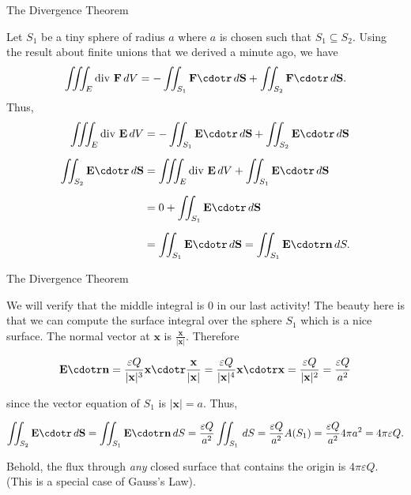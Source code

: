 \documentclass[11pt,english,
handout
]{beamer}
\begin{document}
\begin{frame}[t]{The Divergence Theorem}
\small
\begin{example}
Let $S_1$ be a tiny sphere of radius $a$ where $a$ is chosen such that $S_1\subseteq S_2$. \pause Using the result about finite unions that we derived a minute ago, we have
\[
\iiint_E\text{div }\mathbf{F}\,dV=-\iint_{S_1}\mathbf{F}\cdotr\,d\mathbf{S}+\iint_{S_2}\mathbf{F}\cdotr\,d\mathbf{S}.
\]\pause 
Thus,
{\footnotesize
\begin{align*}
\iiint_E\text{div }\mathbf{E}\,dV&=-\iint_{S_1}\mathbf{E}\cdotr\,d\mathbf{S}+\iint_{S_2}\mathbf{E}\cdotr\,d\mathbf{S}\\[2mm]
\iint_{S_2}\mathbf{E}\cdotr\,d\mathbf{S}&=\iiint_E\text{div }\mathbf{E}\,dV+\iint_{S_1}\mathbf{E}\cdotr\,d\mathbf{S}\\[2mm]
&=0+\iint_{S_1}\mathbf{E}\cdotr\,d\mathbf{S}\\[2mm]
&=\iint_{S_1}\mathbf{E}\cdotr\,d\mathbf{S}=\iint_{S_1}\mathbf{E}\cdotr\mathbf{n}\,dS.
\end{align*}}
\end{example}
\end{frame}








\begin{frame}[t]{The Divergence Theorem}
\small
\begin{example}
We will verify that the middle integral is 0 in our last activity! \pause The beauty here is that we can compute the surface integral over the sphere $S_1$ which is a nice surface. \pause The normal vector at $\mathbf{x}$ is $\frac{\mathbf{x}}{|\mathbf{x}|}$. Therefore

\[
\mathbf{E}\cdotr\mathbf{n}=\frac{\varepsilon Q}{|\mathbf{x}|^3}\mathbf{x}\cdotr\frac{\mathbf{x}}{|\mathbf{x}|}=\frac{\varepsilon Q}{|\mathbf{x}|^4}\mathbf{x}\cdotr\mathbf{x}=\frac{\varepsilon Q}{|\mathbf{x}|^2}=\frac{\varepsilon Q}{a^2}
\]

\vspace{3mm}
since the vector equation of $S_1$ is $|\mathbf{x}|=a$. \pause Thus,

\[
\iint_{S_2}\mathbf{E}\cdotr\,d\mathbf{S}=\iint_{S_1}\mathbf{E}\cdotr\mathbf{n}\,dS=\frac{\varepsilon Q}{a^2}\iint_{S_1}\,dS=\frac{\varepsilon Q}{a^2}A(S_1)=\frac{\varepsilon Q}{a^2}4\pi a^2=4\pi\varepsilon Q.
\]\pause 

\lspace
Behold, the flux through \textit{any} closed surface that contains the origin is $4\pi\varepsilon Q$. (This is a special case of Gauss's Law).
\end{example}
\end{frame}
\end{document}
